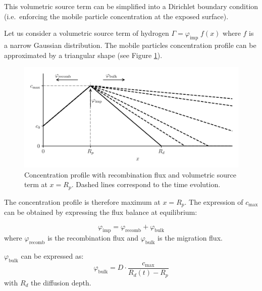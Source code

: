 This volumetric source term can be simplified into a Dirichlet boundary condition (i.e.\ enforcing the mobile particle concentration at the exposed surface).

Let us consider a volumetric source term of hydrogen $\Gamma = \varphi_\mathrm{imp} \; f(x)$ where $f$ is a narrow Gaussian distribution.
The mobile particles concentration profile can be approximated by a triangular shape  (see Figure \ref{fig:recomb sketch}).

\begin{figure}[h!]
    \centering
    \includegraphics[width=0.75\linewidth]{Figures/Chapter2/recomb_sketch.pdf}
    \caption{Concentration profile with recombination flux and volumetric source term at $x=R_p$. Dashed lines correspond to the time evolution.}
    \label{fig:recomb sketch}
\end{figure}

The concentration profile is therefore maximum at $x=R_p$.
The expression of $c_\mathrm{max}$ can be obtained by expressing the flux balance at equilibrium:

\begin{equation}
    \varphi_\mathrm{imp} = \varphi_\mathrm{recomb} + \varphi_\mathrm{bulk}
    \label{eq:flux balance}
\end{equation}
where $\varphi_\mathrm{recomb}$ is the recombination flux and $\varphi_\mathrm{bulk}$ is the migration flux.

$\varphi_\mathrm{bulk}$ can be expressed as:
\begin{equation}
    \varphi_\mathrm{bulk} = D \cdot \frac{c_\mathrm{max}}{R_d(t) - R_p}
\end{equation}
with $R_d$ the diffusion depth.

